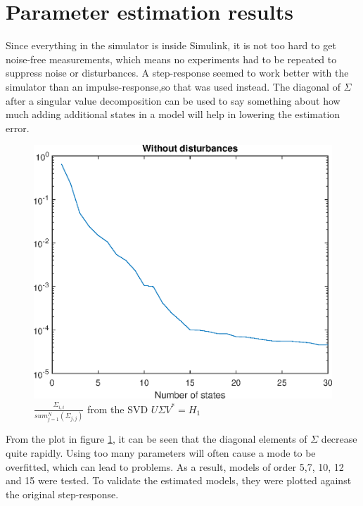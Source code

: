 \section{Parameter estimation results}
\label{sec:ERA_results}
Since everything in the simulator is inside Simulink, it is not too hard to get noise-free measurements, which means no experiments had to be repeated to suppress noise or disturbances. A step-response seemed to work better with the simulator than an impulse-response,so that was used instead. The diagonal of $\Sigma$ after a singular value decomposition can be used to say something about how much adding additional states in a model will help in lowering the estimation error. 


\begin{figure}
    \centering
    \includegraphics[width=\textwidth]{img/Fig_dump/Sigmas_without_disturbances.eps}
    \caption{$\frac{\Sigma_{i,i}}{sum_{j=1}^{N}(\Sigma_{j,j})}$ from the SVD $U\Sigma V^* = H_1$}
    \label{fig:ERA_state_contributions}
\end{figure}
\noindent
From the plot in figure \ref{fig:ERA_state_contributions}, it can be seen that the diagonal elements of $\Sigma$ decrease quite rapidly. Using too many parameters will often cause a mode to be overfitted, which can lead to problems. As a result, models of order 5,7, 10, 12 and 15 were tested. To validate the estimated models, they were plotted against the original step-response. 


